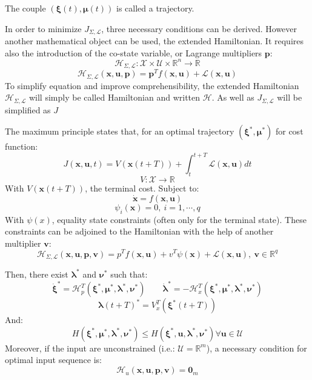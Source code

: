 \documentclass[a4paper, 12pt]{report}
\begin{document}
The couple $(\boldsymbol{\xi}(t), \boldsymbol{\mu}(t))$ is called a trajectory.

In order to minimize  $J_{\Sigma,\mathcal{L}}$, three necessary conditions can be derived. However another mathematical object can be used, the extended Hamiltonian. It requires also the introduction of the co-state variable, or Lagrange multipliers $\boldsymbol{p}$:
\[ \mathcal{H}_{\Sigma,\mathcal{L}}: \mathcal{X} \times \mathcal{U} \times \mathbb{R}^n \rightarrow \mathbb{R} \]
\[ \mathcal{H}_{\Sigma,\mathcal{L}}(\boldsymbol{x}, \boldsymbol{u}, \boldsymbol{p}) = \boldsymbol{p}^Tf(\boldsymbol{x}, \boldsymbol{u}) + \mathcal{L}(\boldsymbol{x}, \boldsymbol{u}) \]
To simplify equation and improve comprehensibility, the extended Hamiltonian $\mathcal{H}_{\Sigma,\mathcal{L}}$ will simply be called Hamiltonian and written $\mathcal{H}$. As well as $J_{\Sigma,\mathcal{L}}$ will be simplified as $J$

The maximum principle states that, for an optimal trajectory $(\boldsymbol{\xi}^*, \boldsymbol{\mu}^*)$ for cost function:
\[ J(\boldsymbol{x}, \boldsymbol{u}, t) = V(\boldsymbol{x}(t+T))  + \int_t^{t+T} \mathcal{L}(\boldsymbol{x}, \boldsymbol{u})dt\]
\[ V: \mathcal{X} \rightarrow \mathbb{R} \]
With $ V(\boldsymbol{x}(t+T))$, the terminal cost. Subject to:
\[ \boldsymbol{\dot x} = f(\boldsymbol{x}, \boldsymbol{u}) \]
\[ \psi_i(\boldsymbol{x}) = 0,\ i = 1, \cdots, q \]
With $\psi(x)$, equality state constraints (often only for the terminal state). These constraints can be adjoined to the Hamiltonian with the help of another multiplier $\boldsymbol{v}$:
\[ \mathcal{H}_{\Sigma,\mathcal{L}}(\boldsymbol{x}, \boldsymbol{u}, \boldsymbol{p}, \boldsymbol{v}) = p^T f(\boldsymbol{x}, \boldsymbol{u}) + v^T\psi(\boldsymbol{x}) + \mathcal{L}(\boldsymbol{x}, \boldsymbol{u}),\ \boldsymbol{v} \in \mathbb{R}^q \]

Then, there exist $\boldsymbol{\lambda}^*$ and $\boldsymbol{\nu}^*$ such that:
\[ \boldsymbol{\dot \xi}^* = \mathcal{H}_p^T (\boldsymbol{\xi}^*, \boldsymbol{\mu}^*, \boldsymbol{\lambda}^*, \boldsymbol{\nu}^*)  \qquad \boldsymbol{\dot \lambda}^*  = -\mathcal{H}_x^T (\boldsymbol{\xi}^*, \boldsymbol{\mu}^*, \boldsymbol{\lambda}^*, \boldsymbol{\nu}^*)\]
\[ \boldsymbol{\lambda}(t+T)^* = V_x^T(\boldsymbol{\xi}^*(t+T)) \]
And:
\[ H(\boldsymbol{\xi}^*, \boldsymbol{\mu}^*, \boldsymbol{\lambda}^*, \boldsymbol{\nu}^*) \leq H(\boldsymbol{\xi}^*, \boldsymbol{u}, \boldsymbol{\lambda}^*, \boldsymbol{\nu}^*) \forall \boldsymbol{u} \in \mathcal{U} \]
Moreover, if the input are unconstrained (i.e.: $\mathcal{U}=\mathbb{R}^m$), a necessary condition for optimal input sequence is:
\[ \mathcal{H}_u (\boldsymbol{x}, \boldsymbol{u}, \boldsymbol{p}, \boldsymbol{v}) = \boldsymbol{0}_m \]
\end{document}
